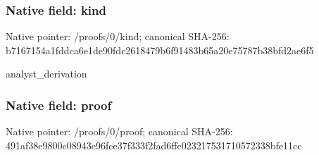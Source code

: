 \documentclass[10pt,a4paper]{article}
\begin{document}
\subsubsection{Native field: kind}
Native pointer: /proofs/0/kind; canonical SHA-256: b7167154a1fddca6e1de90fdc2618479b6f91483b65a20e75787b38bfd2ae6f5

\begingroup\raggedright\sloppy analyst\_\allowbreak{}derivation\par\endgroup

\subsubsection{Native field: proof}
Native pointer: /proofs/0/proof; canonical SHA-256: 491af38e9800c08943e96fce37f333f2fad6ffc023217531710572338bfe11cc
\end{document}
